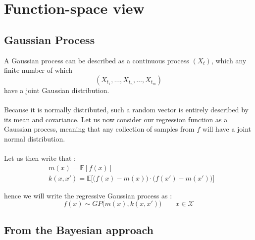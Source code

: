 \documentclass[a4paper]{article}
\begin{document}
	\section{Function-space view}
	{
		\subsection{Gaussian Process}
		{
		\vspace{10pt}
			{
				A Gaussian process can be described as a continuous process $(X_t)$, which any finite number of which
				\begin{equation}
					(X_{t_1},\hdots, X_{t_n}, \hdots, X_{t_m})
				\end{equation}
				have a joint Gaussian distribution.
			}
			
			\paragraph{} Because it is normally distributed, such a random vector is entirely described by its mean and covariance. Let us now consider our regression function as a Gaussian process, meaning that any collection of samples from $f$ will have a joint normal distribution. 
			
			\paragraph{} Let us then write that : 
			\begin{equation}
				\begin{aligned}
					&m(x) = \mathbb{E}\left[f(x)\right] \\
					&k(x,x') = \mathbb{E}\Big[ \big(f(x)-m(x)\big)\cdot\big(f(x')-m(x')\big)\Big]
				\end{aligned}
			\end{equation}
		}
		hence we will write the regressive Gaussian process as : 
		\begin{equation}
			f(x) \sim GP\Big( m(x), k(x,x') \Big) \qquad x\in\mathcal{X}
		\end{equation}
		
		\subsection{From the Bayesian approach}
		{
}}
\end{document}
